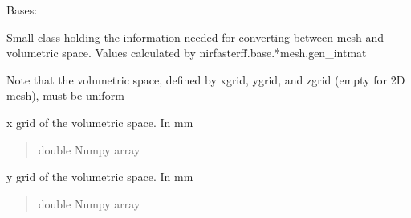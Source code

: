 \documentclass[letterpaper,10pt,english]{sphinxmanual}
\begin{document}
\begin{fulllineitems}
\label{\detokenize{_autosummary/nirfasterff.base.data.meshvol:nirfasterff.base.data.meshvol}}
\pysigstartsignatures
\pysigline
{}
\pysigstopsignatures
\sphinxAtStartPar
Bases: 

\sphinxAtStartPar
Small class holding the information needed for converting between mesh and volumetric space. Values calculated by nirfasterff.base.*mesh.gen\_intmat

\sphinxAtStartPar
Note that the volumetric space, defined by xgrid, ygrid, and zgrid (empty for 2D mesh), must be uniform

\begin{fulllineitems}
\label{\detokenize{_autosummary/nirfasterff.base.data.meshvol:nirfasterff.base.data.meshvol.xgrid}}
\pysigstartsignatures
\pysigline
{}
\pysigstopsignatures
\sphinxAtStartPar
x grid of the volumetric space. In mm
\begin{quote}\begin{description}
\sphinxAtStartPar
double Numpy array

\end{description}\end{quote}

\end{fulllineitems}


\begin{fulllineitems}
\label{\detokenize{_autosummary/nirfasterff.base.data.meshvol:nirfasterff.base.data.meshvol.ygrid}}
\pysigstartsignatures
\pysigline
{}
\pysigstopsignatures
\sphinxAtStartPar
y grid of the volumetric space. In mm
\begin{quote}\begin{description}
\sphinxAtStartPar
double Numpy array

\end{description}\end{quote}


\end{fulllineitems}
\end{fulllineitems}
\end{document}
